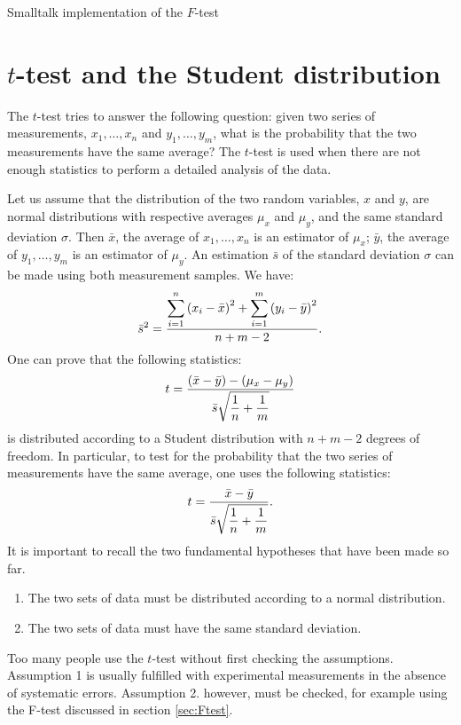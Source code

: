 \begin{listing} Smalltalk implementation of the $F$-test \label{ls:Ftest}


\end{listing}

\section{$t$-test and the Student distribution}
\label{sec:ttest} The $t$-test tries to answer the following
question: given two series of measurements, $x_1,\ldots,x_n$ and
$y_1,\ldots,y_m$, what is the probability that the two
measurements have the same average?  The $t$-test is used when
there are not enough statistics to perform a detailed analysis of
the data.

Let us assume that the distribution of the two random variables,
$x$ and $y$, are normal distributions with respective averages
$\mu_x$ and $\mu_y$, and the same standard deviation $\sigma$.
Then $\bar{x}$, the average of $x_1,\ldots,x_n$ is an estimator of
$\mu_x$; $\bar{y}$, the average of $y_1,\ldots,y_m$ is an
estimator of $\mu_y$. An estimation $\bar{s}$ of the standard
deviation $\sigma$ can be made using both measurement samples. We
have:
\begin{equation}
\label{eq:sbart}
  \bar{s}^2={\displaystyle\sum_{i=1}^n\left(x_i-\bar{x}\right)^2
  + \sum_{i=1}^m\left(y_i-\bar{y}\right)^2\over\displaystyle n+m-2}.
\end{equation}
One can prove that the following statistics:
\begin{equation}
  t={\displaystyle \left(\bar{x}-\bar{y}\right)-\left(\mu_x
  -\mu_y\right)
  \over\displaystyle \bar{s}\sqrt{{1\over n}+{1\over m}}}
\end{equation}
is distributed according to a Student distribution with $n+m-2$
degrees of freedom. In particular, to test for the probability
that the two series of measurements have the same average, one
uses the following statistics:
\begin{equation}
\label{eq:tTest}
  t={\displaystyle \bar{x}-\bar{y}
  \over\displaystyle \bar{s}\sqrt{{1\over n}+{1\over m}}}.
\end{equation}
It is important to recall the two fundamental hypotheses that have
been made so far.
\begin{enumerate}
  \item The two sets of data must be distributed according to a normal distribution.
  \item The two sets of data must have the same standard deviation.
\end{enumerate}
Too many people use the $t$-test without first checking the
assumptions. Assumption 1 is usually fulfilled with experimental
measurements in the absence of systematic errors. Assumption 2.
however, must be checked, for example using the F-test discussed
in section \ref{sec:Ftest}.

